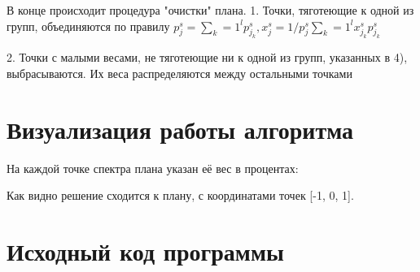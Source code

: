 В конце происходит процедура "очистки" плана.
1. Точки, тяготеющие к одной из групп, объединяются по правилу
\( p_j^s = \sum_k=1^l p_{j_k}^s, x_j^s = 1 / p_j^s \sum_k=1^l {x_{j_k}^s p_{j_k}^s} \)

2. Точки с малыми весами, не тяготеющие ни к одной из групп, указанных в 4), выбрасываются.
Их веса распределяются между остальными точками 





\section{Визуализация работы алгоритма}

На каждой точке спектра плана указан её вес в процентах:


Как видно решение сходится к плану, с координатами точек [-1, 0, 1].


\section{Исходный код программы}
